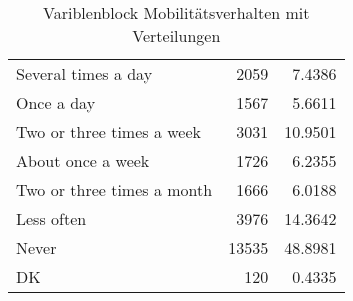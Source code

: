 \begin{table}
\begin{tabularx}{\textwidth} { b{12cm} | r | r}
Several times a day          &   2059 &  7.4386 \\
Once a day                   &   1567 &  5.6611 \\
Two or three times a week    &   3031 & 10.9501 \\
About once a week            &   1726 &  6.2355 \\
Two or three times a month   &   1666 &  6.0188 \\
Less often                   &   3976 & 14.3642 \\
Never                        &  13535 & 48.8981 \\
DK                           &    120 &  0.4335 \\
	\end{tabularx}
	\caption{Variblenblock Mobilitätsverhalten mit Verteilungen}
\end{table}


